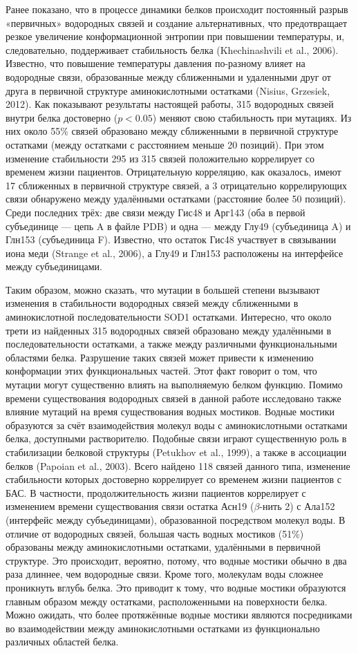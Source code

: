 Ранее показано, что в процессе динамики белков происходит постоянный разрыв «первичных» водородных связей и создание альтернативных, что предотвращает резкое увеличение конформационной энтропии при повышении температуры, и, следовательно, поддерживает стабильность белка (Khechinashvili et al., 2006).  Известно, что повышение температуры давления по-разному влияет на водородные связи, образованные между сближенными и удаленными друг от друга в первичной структуре аминокислотными остатками (Nisius, Grzesiek, 2012). Как показывают результаты настоящей работы, 315 водородных связей внутри белка достоверно ($p < 0.05$) меняют свою стабильность при мутациях. Из них около 55\% связей образовано между сближенными в первичной структуре остатками (между остатками с расстоянием меньше 20 позиций). При этом изменение стабильности 295 из 315 связей положительно коррелирует со временем жизни пациентов. Отрицательную корреляцию, как оказалось, имеют 17 сближенных в первичной структуре связей, а 3 отрицательно коррелирующих связи обнаружено между удалёнными остатками (расстояние более 50 позиций). Среди последних трёх: две связи между Гис48 и Арг143 (оба в первой субъединице — цепь A в файле PDB) и одна — между Глу49 (субъединица A) и Глн153 (субъединица F).  Известно, что остаток Гис48 участвует в связывании иона меди (Strange et al., 2006), а Глу49 и Глн153 расположены на интерфейсе между субъединицами. 

Таким образом, можно сказать, что мутации в большей степени вызывают изменения в стабильности водородных связей между сближенными в аминокислотной последовательности SOD1 остатками. Интересно, что около трети из найденных 315  водородных связей образовано между удалёнными в последовательности остатками, а также между различными функциональными областями белка. Разрушение таких связей может привести к изменению конформации этих функциональных частей. Этот факт говорит о том, что мутации могут существенно влиять на выполняемую белком функцию. 
Помимо времени существования водородных связей в данной работе исследовано также влияние мутаций на время существования водных мостиков. Водные мостики образуются за счёт взаимодействия молекул воды с аминокислотными остатками белка, доступными растворителю. Подобные связи играют существенную роль в стабилизации белковой структуры (Petukhov et al., 1999), а также в ассоциации белков (Papoian et al., 2003). Всего найдено 118 связей данного типа, изменение стабильности которых достоверно коррелирует со временем жизни пациентов с БАС. В частности, продолжительность жизни пациентов коррелирует с изменением времени существования связи остатка Асн19 ($\beta$-нить 2) с Ала152 (интерфейс между субъединицами), образованной посредством молекул воды. 
В отличие от водородных связей, большая часть водных мостиков (51\%) образованы между аминокислотными остатками, удалёнными в первичной структуре. Это происходит, вероятно, потому, что водные мостики обычно в два раза длиннее, чем водородные связи. Кроме того, молекулам воды сложнее проникнуть вглубь белка. Это приводит к тому, что водные мостики образуются главным образом между остатками, расположенными на поверхности белка. Можно ожидать, что более протяжённые водные мостики являются посредниками во взаимодействии между аминокислотными остатками из функционально различных областей белка.


